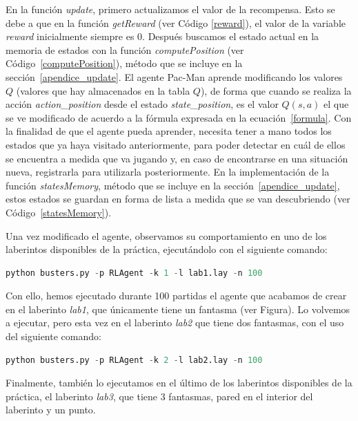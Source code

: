 \documentclass[11pt]{exam}
\begin{document}
En la función \textit{update}, primero actualizamos el valor de la recompensa. Esto se debe a que en la función \textit{getReward} (ver Código \ref{reward}), el valor de la variable \textit{reward} inicialmente siempre es 0. Después buscamos el estado actual en la memoria de estados con la función \textit{computePosition} (ver Código~\ref{computePosition}), método que se incluye en la sección~\ref{apendice_update}. El agente Pac-Man aprende modificando los valores $Q$ (valores que hay almacenados en la tabla $Q$), de forma que cuando se realiza la acción \textit{action\_position} desde el estado \textit{state\_position}, es el valor $Q(s,a)$ el que se ve modificado de acuerdo a la fórmula expresada en la ecuación~\ref{formula}. Con la finalidad de que el agente pueda aprender, necesita tener a mano todos los estados que ya haya visitado anteriormente, para poder detectar en cuál de ellos se encuentra a medida que va jugando y, en caso de encontrarse en una situación nueva, registrarla para utilizarla posteriormente. En la implementación de la función \textit{statesMemory}, método que se incluye en la sección~\ref{apendice_update}, estos estados se guardan en forma de lista a medida que se van descubriendo (ver Código~\ref{statesMemory}).
\vspace*{3mm}

Una vez modificado el agente, observamos su comportamiento en uno de los laberintos disponibles de la práctica, ejecutándolo con el siguiente comando:

\begin{lstlisting}[language=python, basicstyle=\footnotesize]
python busters.py -p RLAgent -k 1 -l lab1.lay -n 100
\end{lstlisting}

Con ello, hemos ejecutado durante 100 partidas el agente que acabamos de crear en el laberinto \textit{lab1}, que únicamente tiene un fantasma (ver Figura). Lo volvemos a ejecutar, pero esta vez en el laberinto \textit{lab2} que tiene dos fantasmas, con el uso del siguiente comando:

\begin{lstlisting}[language=python, basicstyle=\footnotesize]
python busters.py -p RLAgent -k 2 -l lab2.lay -n 100
\end{lstlisting}

Finalmente, también lo ejecutamos en el último de los laberintos disponibles de la práctica, el laberinto \textit{lab3}, que tiene 3 fantasmas, pared en el interior del laberinto y un punto.
\end{document}

